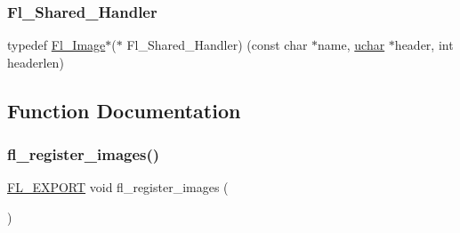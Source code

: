 \subsubsection{\texorpdfstring{Fl\+\_\+\+Shared\+\_\+\+Handler}{Fl\_Shared\_Handler}}
{\footnotesize\ttfamily typedef \hyperlink{class_fl___image}{Fl\+\_\+\+Image}$\ast$($\ast$ Fl\+\_\+\+Shared\+\_\+\+Handler) (const char $\ast$name, \hyperlink{fl__types_8h_a65f85814a8290f9797005d3b28e7e5fc}{uchar} $\ast$header, int headerlen)}



\subsection{Function Documentation}
\mbox{\label{_fl___shared___image_8_h_a5c361cb2fdac6c22f6259f5e044657f4}} 
\subsubsection{\texorpdfstring{fl\+\_\+register\+\_\+images()}{fl\_register\_images()}}
{\footnotesize\ttfamily \hyperlink{_fl___export_8_h_aa9ba29a18aee9d738370a06eeb4470fc}{F\+L\+\_\+\+E\+X\+P\+O\+RT} void fl\+\_\+register\+\_\+images (\begin{DoxyParamCaption}{ }\end{DoxyParamCaption})}

